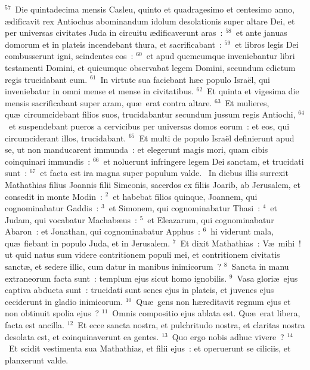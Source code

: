 ${}^{57}$~Die quintadecima mensis Casleu, quinto et quadragesimo et centesimo anno, \ae dificavit rex Antiochus abominandum idolum desolationis super altare Dei, et per universas civitates Juda in circuitu \ae dificaverunt aras~:
${}^{58}$~et ante januas domorum et in plateis incendebant thura, et sacrificabant~:
${}^{59}$~et libros legis Dei combusserunt igni, scindentes eos~:
${}^{60}$~et apud quemcumque inveniebantur libri testamenti Domini, et quicumque observabat legem Domini, secundum edictum regis trucidabant eum.
${}^{61}$~In virtute sua faciebant h\ae c populo Isra\"el, qui inveniebatur in omni mense et mense in civitatibus.
${}^{62}$~Et quinta et vigesima die mensis sacrificabant super aram, qu\ae\ erat contra altare.
${}^{63}$~Et mulieres, qu\ae\ circumcidebant filios suos, trucidabantur secundum jussum regis Antiochi,
${}^{64}$~et suspendebant pueros a cervicibus per universas domos eorum~: et eos, qui circumciderant illos, trucidabant.
${}^{65}$~Et multi de populo Isra\"el definierunt apud se, ut non manducarent immunda~: et elegerunt magis mori, quam cibis coinquinari immundis~:
${}^{66}$~et noluerunt infringere legem Dei sanctam, et trucidati sunt~:
${}^{67}$~et facta est ira magna super populum valde.
~\lettrine[lines=10,image=true,loversize=0.05,lraise=-0.03]{I}{}n diebus illis surrexit Mathathias filius Joannis filii Simeonis, sacerdos ex filiis Joarib, ab Jerusalem, et consedit in monte Modin~:
${}^{2}$~et habebat filios quinque, Joannem, qui cognominabatur Gaddis~:
${}^{3}$~et Simonem, qui cognominabatur Thasi~:
${}^{4}$~et Judam, qui vocabatur Machab\ae us~:
${}^{5}$~et Eleazarum, qui cognominabatur Abaron~: et Jonathan, qui cognominabatur Apphus~:
${}^{6}$~hi viderunt mala, qu\ae\ fiebant in populo Juda, et in Jerusalem.
${}^{7}$~Et dixit Mathathias~: V\ae\ mihi~! ut quid natus sum videre contritionem populi mei, et contritionem civitatis sanct\ae , et sedere illic, cum datur in manibus inimicorum~?
${}^{8}$~Sancta in manu extraneorum facta sunt~: templum ejus sicut homo ignobilis.
${}^{9}$~Vasa glori\ae\ ejus captiva abducta sunt~: trucidati sunt senes ejus in plateis, et juvenes ejus ceciderunt in gladio inimicorum.
${}^{10}$~Qu\ae\ gens non h\ae reditavit regnum ejus et non obtinuit spolia ejus~?
${}^{11}$~Omnis compositio ejus ablata est. Qu\ae\ erat libera, facta est ancilla.
${}^{12}$~Et ecce sancta nostra, et pulchritudo nostra, et claritas nostra desolata est, et coinquinaverunt ea gentes.
${}^{13}$~Quo ergo nobis adhuc vivere~?
${}^{14}$~Et scidit vestimenta sua Mathathias, et filii ejus~: et operuerunt se ciliciis, et planxerunt valde.



